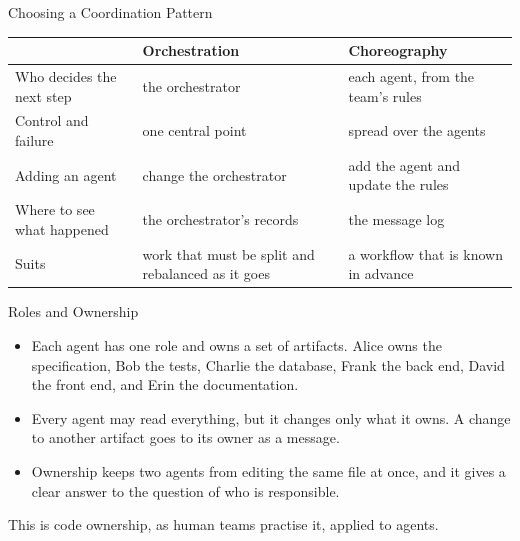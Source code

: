 \documentclass[aspectratio=169, table, 12pt]{beamer}
\begin{document}
\begin{frame}{{\Large Choosing a Coordination Pattern}}
  \vspace{4pt}
  \centering
  {\footnotesize
  \begin{tabularx}{\textwidth}{lYY}
    \hline
    & \textbf{Orchestration} & \textbf{Choreography} \\
    \hline
    Who decides the next step & the orchestrator & each agent, from the team's rules \\
    \hline
    Control and failure & one central point & spread over the agents \\
    \hline
    Adding an agent & change the orchestrator & add the agent and update the rules \\
    \hline
    Where to see what happened & the orchestrator's records & the message log \\
    \hline
    Suits & work that must be split and rebalanced as it goes & a workflow that is known in advance \\
    \hline
  \end{tabularx}}
\end{frame}

\begin{frame}{{\Large Roles and Ownership}}
  \vspace{10pt}
  \begin{itemize}
    \item Each agent has one role and owns a set of artifacts. Alice owns the
          specification, Bob the tests, Charlie the database, Frank the back
          end, David the front end, and Erin the documentation.
    \item Every agent may read everything, but it changes only what it owns.
          A change to another artifact goes to its owner as a message.
    \item Ownership keeps two agents from editing the same file at once, and
          it gives a clear answer to the question of who is responsible.
  \end{itemize}
  \vspace{6pt}
  {\small This is code ownership, as human teams practise it, applied to
  agents.}
\end{frame}
\end{document}
